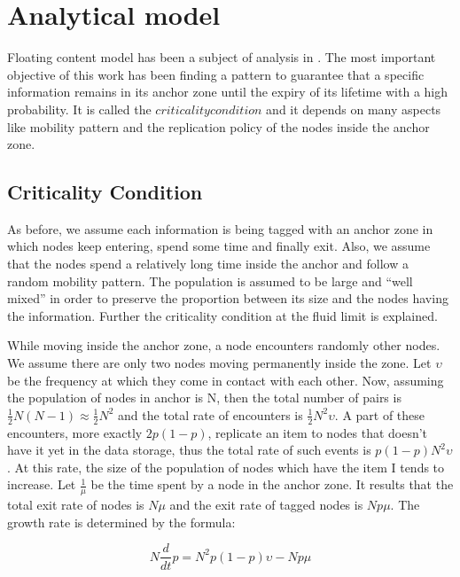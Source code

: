 \section {Analytical model}

Floating content model has been a subject of analysis in
\cite{whendoesdatafloats} . The most important objective of this work has been
finding a pattern to guarantee that a specific information remains in its anchor
zone until the expiry of its lifetime with a high probability. It is called the
$criticality condition$ and it depends on many aspects like mobility pattern and
the replication policy of the nodes inside the anchor zone. 

\subsection{Criticality Condition}

As before, we assume each information is being tagged with an anchor zone in
which nodes keep entering, spend some time and finally exit. Also, we assume
that the nodes spend a relatively long time inside the anchor and follow a
random mobility pattern. The population is assumed to be large and ``well
mixed'' in order to preserve the proportion between its size and the nodes
having the information. Further the criticality condition at the
fluid limit is explained.

While moving inside the anchor zone, a node encounters randomly other nodes.
We assume there are only two nodes moving permanently inside the zone. Let
$\upsilon$ be the frequency at which they come in contact with each other. Now,
assuming the population of nodes in anchor is N, then the total number of pairs
is $\frac{1}{2}N(N-1) \approx \frac{1}{2}N^2$ and the total rate of encounters
is $\frac{1}{2}N^2\upsilon$. A part of these encounters, more exactly $2p(1-p)$,
replicate an item to nodes that doesn't have it yet in the data storage, thus
the total rate of such events is $p(1-p)N^2\upsilon$. At this rate, the size of
the population of nodes which have the item I tends to increase. Let
$\frac{1}{\mu}$ be the time spent by a node in the anchor zone. It results that
the total exit rate of nodes is $N\mu$ and the exit rate of tagged nodes is
$Np\mu$. The growth rate is determined by the formula:

\begin{equation}
N\frac{d}{dt}p = N^2p(1-p)\upsilon - Np\mu
\end{equation}
